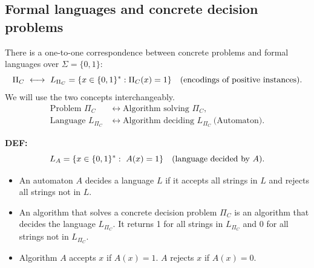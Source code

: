 
\subsection{Formal languages and concrete decision problems}
There is a one-to-one correspondence between concrete problems and formal languages over $\Sigma=\{0,1\}$:
\[
\Pi_C\ \longleftrightarrow\ L_{\Pi_C}=\{x\in\bits^*:\Pi_C(x)=1\}
\quad\text{(encodings of positive instances)}.
\]
We will use the two concepts interchangeably.
\[
\begin{aligned}
\text{Problem }\Pi_C&\longleftrightarrow\text{Algorithm solving }\Pi_C,\\
\text{Language }L_{\Pi_C}&\longleftrightarrow\text{Algorithm deciding }L_{\Pi_C}\ \text{(Automaton)}.
\end{aligned}
\]

\begin{notesdefinition}
\textbf{DEF:}
\[
L_A=\{x\in\{0,1\}^*:\ A(x)=1\}\quad\text{(language decided by }A\text{)}.
\]
\end{notesdefinition}

\begin{itemize}
    \item An automaton $A$ decides a language $L$ if it accepts all strings in $L$ and rejects all strings not in $L$.
    \item An algorithm that solves a concrete decision problem $\Pi_C$ is an algorithm that decides the language $L_{\Pi_C}$. It returns 1 for all strings in $L_{\Pi_C}$ and 0 for all strings not in $L_{\Pi_C}$.
    \item Algorithm $A$ accepts $x$ if $A(x)=1$. $A$ rejects $x$ if $A(x)=0$.
\end{itemize}
